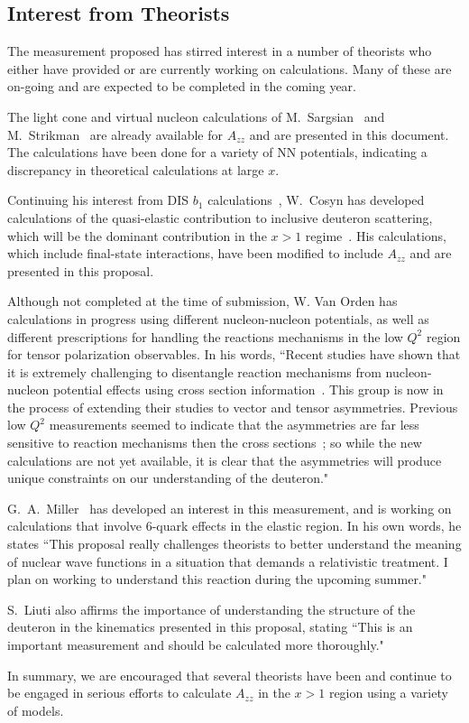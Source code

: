 \subsection{Interest from Theorists}

The measurement proposed has stirred interest in a number of theorists who either have provided or are currently working on calculations. Many of these are on-going and are expected to be completed in the coming year.

The light cone and virtual nucleon calculations of M.~Sargsian~\cite{misak-convo} and M.~Strikman~\cite{strikman-convo} are already available for $A_{zz}$ and are presented in this document. The calculations have been done for a variety of NN potentials, indicating a discrepancy in theoretical calculations at large $x$. 

Continuing his interest from DIS $b_1$ calculations~\cite{Cosyn:2014sqa}, W.~Cosyn has developed calculations of the quasi-elastic contribution to inclusive deuteron scattering, which will be the dominant contribution in the $x>1$ regime~\cite{cosyn-convo}. His calculations, which include final-state interactions, have been modified to include $A_{zz}$ and are presented in this proposal.

Although not completed at the time of submission, W. Van Orden has calculations in progress using different nucleon-nucleon potentials, as well as different prescriptions for handling the reactions mechanisms in the low $Q^2$ region for tensor polarization observables. In his words, ``Recent studies have shown that it is extremely challenging to disentangle reaction mechanisms from nucleon-nucleon potential effects using cross section information~\cite{Ford:2014yua}. This group is now in the process of extending their studies to vector and tensor asymmetries. Previous low $Q^2$ measurements seemed to indicate that the asymmetries are far less sensitive to reaction 
mechanisms then the cross sections~\cite{Passchier:2001uc}; so while the 
new calculations are not yet available, it is clear that the asymmetries will produce unique constraints 
on our understanding of the deuteron."~\cite{vanorden-convo}

G.~A.~Miller~\cite{miller-convo} has developed an interest in this measurement, and is working on calculations that involve 6-quark effects in the elastic region. In his own words, he states ``This proposal really challenges theorists to better understand the meaning of nuclear wave functions in a situation that demands a relativistic treatment. I plan on working to understand this reaction during the upcoming summer."

S.~Liuti also affirms the importance of understanding the structure of the deuteron in the kinematics presented in this proposal, stating ``This is an important measurement and should be calculated more thoroughly."~\cite{liuti-convo}



In summary, we are encouraged that several theorists have been and continue to be engaged in serious efforts to calculate $A_{zz}$ in the $x>1$ region using a variety of models.